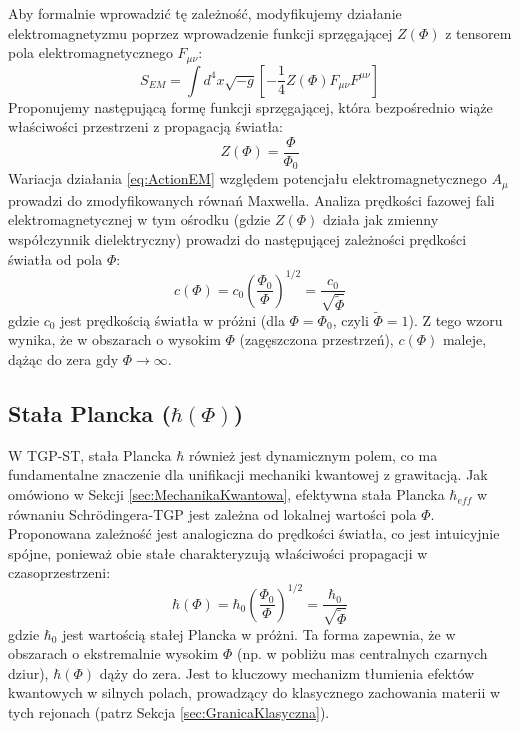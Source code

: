 \documentclass[11pt,a4paper]{article}
\begin{document}
Aby formalnie wprowadzić tę zależność, modyfikujemy działanie elektromagnetyzmu poprzez wprowadzenie funkcji sprzęgającej $Z(\Phi)$ z tensorem pola elektromagnetycznego $F_{\mu\nu}$:
\begin{equation}
    S_{EM} = \int d^4x \sqrt{-g} \left[ -\frac{1}{4} Z(\Phi) F_{\mu\nu} F^{\mu\nu} \right]
    \label{eq:ActionEM}
\end{equation}
Proponujemy następującą formę funkcji sprzęgającej, która bezpośrednio wiąże właściwości przestrzeni z propagacją światła:
\begin{equation}
    Z(\Phi) = \frac{\Phi}{\Phi_0}
    \label{eq:ZPhi}
\end{equation}
Wariacja działania \eqref{eq:ActionEM} względem potencjału elektromagnetycznego $A_\mu$ prowadzi do zmodyfikowanych równań Maxwella. Analiza prędkości fazowej fali elektromagnetycznej w tym ośrodku (gdzie $Z(\Phi)$ działa jak zmienny współczynnik dielektryczny) prowadzi do następującej zależności prędkości światła od pola $\Phi$:
\begin{equation}
    c(\Phi) = c_0 \left(\frac{\Phi_0}{\Phi}\right)^{1/2} = \frac{c_0}{\sqrt{\tilde{\Phi}}}
    \label{eq:cPhi}
\end{equation}
gdzie $c_0$ jest prędkością światła w próżni (dla $\Phi=\Phi_0$, czyli $\tilde{\Phi}=1$). Z tego wzoru wynika, że w obszarach o wysokim $\Phi$ (zagęszczona przestrzeń), $c(\Phi)$ maleje, dążąc do zera gdy $\Phi \rightarrow \infty$.

\subsection{Stała Plancka ($\hbar(\Phi)$)}
W TGP-ST, stała Plancka $\hbar$ również jest dynamicznym polem, co ma fundamentalne znaczenie dla unifikacji mechaniki kwantowej z grawitacją. Jak omówiono w Sekcji \ref{sec:MechanikaKwantowa}, efektywna stała Plancka $\hbar_{eff}$ w równaniu Schrödingera-TGP jest zależna od lokalnej wartości pola $\Phi$. Proponowana zależność jest analogiczna do prędkości światła, co jest intuicyjnie spójne, ponieważ obie stałe charakteryzują właściwości propagacji w czasoprzestrzeni:
\begin{equation}
    \hbar(\Phi) = \hbar_0 \left(\frac{\Phi_0}{\Phi}\right)^{1/2} = \frac{\hbar_0}{\sqrt{\tilde{\Phi}}}
    \label{eq:hbarPhi}
\end{equation}
gdzie $\hbar_0$ jest wartością stałej Plancka w próżni. Ta forma zapewnia, że w obszarach o ekstremalnie wysokim $\Phi$ (np. w pobliżu mas centralnych czarnych dziur), $\hbar(\Phi)$ dąży do zera. Jest to kluczowy mechanizm tłumienia efektów kwantowych w silnych polach, prowadzący do klasycznego zachowania materii w tych rejonach (patrz Sekcja \ref{sec:GranicaKlasyczna}).
\end{document}
